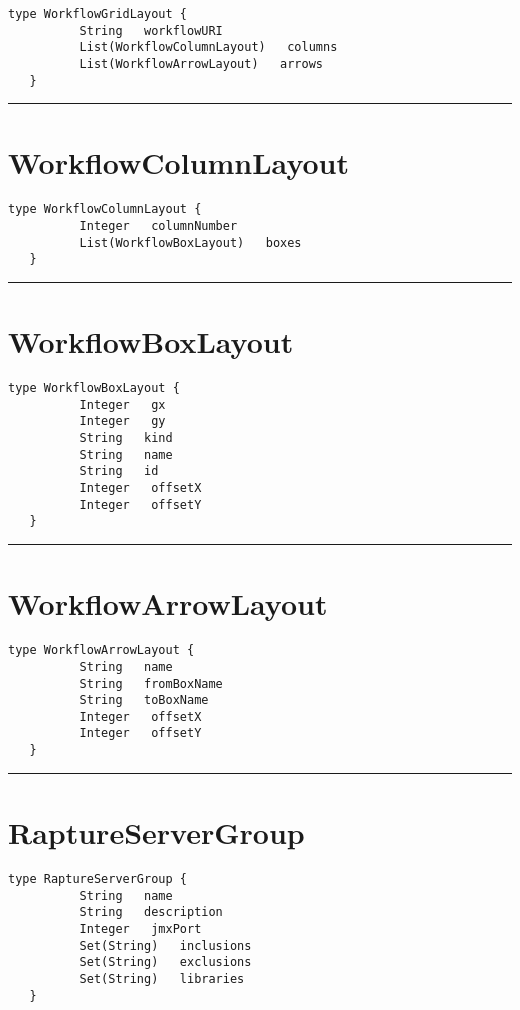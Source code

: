 \begin{lstlisting}[style=nonumbers]
   type WorkflowGridLayout {
          String   workflowURI
          List(WorkflowColumnLayout)   columns
          List(WorkflowArrowLayout)   arrows
   }
\end{lstlisting}

\rule{12cm}{2pt}
\section{WorkflowColumnLayout}
\label{type:WorkflowColumnLayout}

\begin{lstlisting}[style=nonumbers]
   type WorkflowColumnLayout {
          Integer   columnNumber
          List(WorkflowBoxLayout)   boxes
   }
\end{lstlisting}

\rule{12cm}{2pt}
\section{WorkflowBoxLayout}
\label{type:WorkflowBoxLayout}

\begin{lstlisting}[style=nonumbers]
   type WorkflowBoxLayout {
          Integer   gx
          Integer   gy
          String   kind
          String   name
          String   id
          Integer   offsetX
          Integer   offsetY
   }
\end{lstlisting}

\rule{12cm}{2pt}
\section{WorkflowArrowLayout}
\label{type:WorkflowArrowLayout}

\begin{lstlisting}[style=nonumbers]
   type WorkflowArrowLayout {
          String   name
          String   fromBoxName
          String   toBoxName
          Integer   offsetX
          Integer   offsetY
   }
\end{lstlisting}

\rule{12cm}{2pt}
\section{RaptureServerGroup}
\label{type:RaptureServerGroup}

\begin{lstlisting}[style=nonumbers]
   type RaptureServerGroup {
          String   name
          String   description
          Integer   jmxPort
          Set(String)   inclusions
          Set(String)   exclusions
          Set(String)   libraries
   }
\end{lstlisting}

